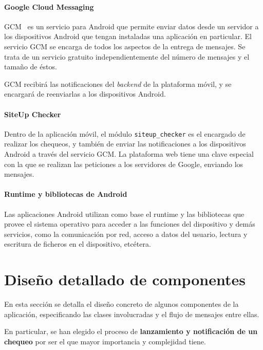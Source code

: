 \paragraph{Google Cloud Messaging}

GCM~\cite{gcm} es un servicio para Android que permite enviar datos desde un
servidor a los dispositivos Android que tengan instaladas una aplicación en
particular. El servicio GCM se encarga de todos los aspectos de la entrega de
mensajes. Se trata de un servicio gratuito independientemente del número de
mensajes y el tamaño de éstos.

GCM recibirá las notificaciones del \textit{backend} de la plataforma móvil, y
se encargará de reenviarlas a los dispositivos Android.

\paragraph{SiteUp Checker}

Dentro de la aplicación móvil, el módulo \texttt{siteup\_checker} es el
encargado de realizar los chequeos, y también de enviar las notificaciones a los
dispositivos Android a través del servicio GCM. La plataforma web tiene una
clave especial con la que se realizan las peticiones a los servidores de Google,
enviando los mensajes.

\paragraph{Runtime y bibliotecas de Android}

Las aplicaciones Android utilizan como base el runtime y las bibliotecas que
provee el sistema operativo para acceder a las funciones del dispositivo y demás
servicios, como la comunicación por red, acceso a datos del usuario, lectura y
escritura de ficheros en el dispositivo, etcétera.

\section{Diseño detallado de componentes}
\label{sec:diseno-detallado-componentes}

En esta sección se detalla el diseño concreto de algunos componentes de la
aplicación, especificando las clases involucradas y el flujo de mensajes entre
ellas.

En particular, se han elegido el proceso de \textbf{lanzamiento y notificación
  de un chequeo} por ser el que mayor importancia y complejidad tiene.

